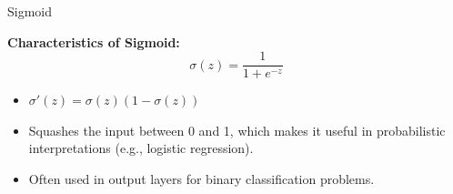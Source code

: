 \documentclass[serif, aspectratio=169]{beamer}
\begin{document}
\begin{frame}{Sigmoid}

    \textbf{Characteristics of Sigmoid:}
    \begin{equation*}
              \sigma(z) = \frac{1}{1 + e^{-z}}
    \end{equation*}
\begin{itemize}
    \item $\sigma'(z) = \sigma(z)(1 - \sigma(z))$
    \item Squashes the input between 0 and 1, which makes it useful in probabilistic interpretations (e.g., logistic regression).
    \item Often used in output layers for binary classification problems.
\end{itemize}

    \begin{center}
    \end{center}
\end{frame}

%
\end{document}
